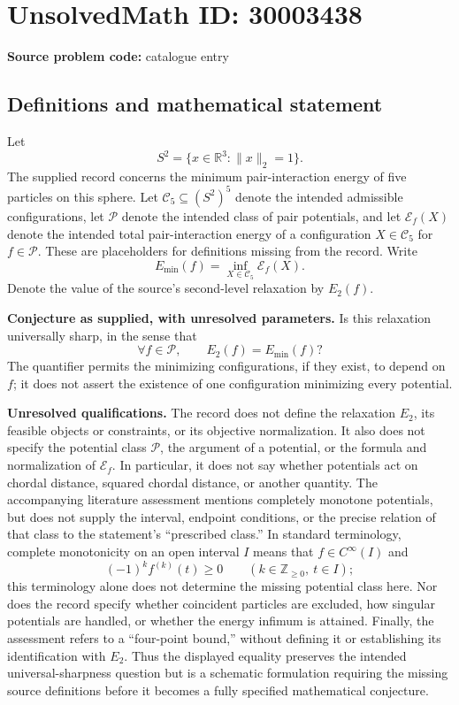 \documentclass[11pt]{article}
\newcommand{\Z}{\mathbb{Z}}
\newcommand{\R}{\mathbb{R}}
\begin{document}
\section*{UnsolvedMath ID: 30003438}
\textbf{Source problem code:} catalogue entry
\subsection{Definitions and mathematical statement}
Let
\[
S^2=\{x\in\R^3:\|x\|_2=1\}.
\]
The supplied record concerns the minimum pair-interaction energy of five particles on this sphere. Let \(\mathcal C_5\subseteq(S^2)^5\) denote the intended admissible configurations, let \(\mathcal P\) denote the intended class of pair potentials, and let \(\mathcal E_f(X)\) denote the intended total pair-interaction energy of a configuration \(X\in\mathcal C_5\) for \(f\in\mathcal P\). These are placeholders for definitions missing from the record. Write
\[
E_{\min}(f)=\inf_{X\in\mathcal C_5}\mathcal E_f(X).
\]
Denote the value of the source's second-level relaxation by \(E_2(f)\).

\textbf{Conjecture as supplied, with unresolved parameters.} Is this relaxation universally sharp, in the sense that
\[
\forall f\in\mathcal P,\qquad E_2(f)=E_{\min}(f)?
\]
The quantifier permits the minimizing configurations, if they exist, to depend on \(f\); it does not assert the existence of one configuration minimizing every potential.

\textbf{Unresolved qualifications.} The record does not define the relaxation \(E_2\), its feasible objects or constraints, or its objective normalization. It also does not specify the potential class \(\mathcal P\), the argument of a potential, or the formula and normalization of \(\mathcal E_f\). In particular, it does not say whether potentials act on chordal distance, squared chordal distance, or another quantity. The accompanying literature assessment mentions completely monotone potentials, but does not supply the interval, endpoint conditions, or the precise relation of that class to the statement's ``prescribed class.'' In standard terminology, complete monotonicity on an open interval \(I\) means that \(f\in C^\infty(I)\) and
\[
(-1)^k f^{(k)}(t)\geq0\qquad(k\in\Z_{\geq0},\ t\in I);
\]
this terminology alone does not determine the missing potential class here. Nor does the record specify whether coincident particles are excluded, how singular potentials are handled, or whether the energy infimum is attained. Finally, the assessment refers to a ``four-point bound,'' without defining it or establishing its identification with \(E_2\). Thus the displayed equality preserves the intended universal-sharpness question but is a schematic formulation requiring the missing source definitions before it becomes a fully specified mathematical conjecture.
\end{document}
